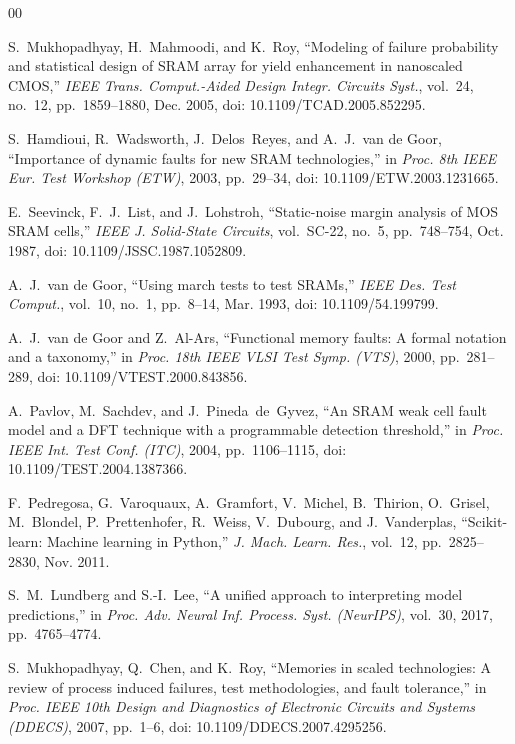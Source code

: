 \documentclass[conference]{IEEEtran}
\begin{document}

\begin{thebibliography}{00}

S.~Mukhopadhyay, H.~Mahmoodi, and K.~Roy, ``Modeling of failure probability and statistical design of SRAM array for yield enhancement in nanoscaled CMOS,'' \emph{IEEE Trans. Comput.-Aided Design Integr. Circuits Syst.}, vol.~24, no.~12, pp.~1859--1880, Dec. 2005, doi: 10.1109/TCAD.2005.852295.

S.~Hamdioui, R.~Wadsworth, J.~Delos~Reyes, and A.~J.~van de Goor, ``Importance of dynamic faults for new SRAM technologies,'' in \emph{Proc. 8th IEEE Eur. Test Workshop (ETW)}, 2003, pp.~29--34, doi: 10.1109/ETW.2003.1231665.

E.~Seevinck, F.~J.~List, and J.~Lohstroh, ``Static-noise margin analysis of MOS SRAM cells,'' \emph{IEEE J. Solid-State Circuits}, vol.~SC-22, no.~5, pp.~748--754, Oct. 1987, doi: 10.1109/JSSC.1987.1052809.

A.~J.~van de Goor, ``Using march tests to test SRAMs,'' \emph{IEEE Des. Test Comput.}, vol.~10, no.~1, pp.~8--14, Mar. 1993, doi: 10.1109/54.199799.

A.~J.~van de Goor and Z.~Al-Ars, ``Functional memory faults: A formal notation and a taxonomy,'' in \emph{Proc. 18th IEEE VLSI Test Symp. (VTS)}, 2000, pp.~281--289, doi: 10.1109/VTEST.2000.843856.

A.~Pavlov, M.~Sachdev, and J.~Pineda~de~Gyvez, ``An SRAM weak cell fault model and a DFT technique with a programmable detection threshold,'' in \emph{Proc. IEEE Int. Test Conf. (ITC)}, 2004, pp.~1106--1115, doi: 10.1109/TEST.2004.1387366.

F.~Pedregosa, G.~Varoquaux, A.~Gramfort, V.~Michel, B.~Thirion, O.~Grisel, M.~Blondel, P.~Prettenhofer, R.~Weiss, V.~Dubourg, and J.~Vanderplas, ``Scikit-learn: Machine learning in Python,'' \emph{J. Mach. Learn. Res.}, vol.~12, pp.~2825--2830, Nov. 2011.

S.~M.~Lundberg and S.-I.~Lee, ``A unified approach to interpreting model predictions,'' in \emph{Proc. Adv. Neural Inf. Process. Syst. (NeurIPS)}, vol.~30, 2017, pp.~4765--4774.

S.~Mukhopadhyay, Q.~Chen, and K.~Roy, ``Memories in scaled technologies: A review of process induced failures, test methodologies, and fault tolerance,'' in \emph{Proc. IEEE 10th Design and Diagnostics of Electronic Circuits and Systems (DDECS)}, 2007, pp.~1--6, doi: 10.1109/DDECS.2007.4295256.


\end{thebibliography}
\end{document}
